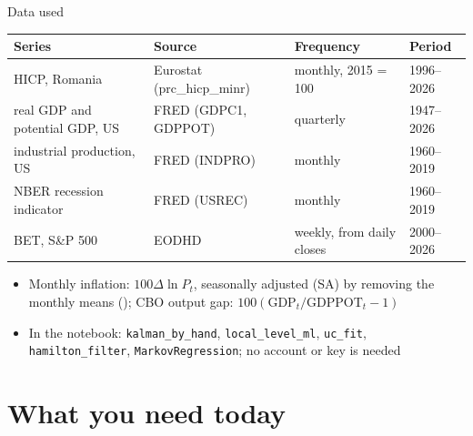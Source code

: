 \begin{frame}{Data used}
\itemsize{\small}
\begin{center}
\footnotesize
\begin{tabular}{llll}
\toprule
\textbf{Series} & \textbf{Source} & \textbf{Frequency} & \textbf{Period} \\
\midrule
HICP, Romania & Eurostat (prc\_hicp\_minr) & monthly, 2015 = 100 & 1996--2026 \\
real GDP and potential GDP, US & FRED (GDPC1, GDPPOT) & quarterly & 1947--2026 \\
industrial production, US & FRED (INDPRO) & monthly & 1960--2019 \\
NBER recession indicator & FRED (USREC) & monthly & 1960--2019 \\
BET, S\&P 500 & EODHD & weekly, from daily closes & 2000--2026 \\
\bottomrule
\end{tabular}
\end{center}
\begin{itemize}
    \item Monthly inflation: $100\Delta\ln P_t$, seasonally adjusted (SA) by removing the monthly means (); CBO output gap: $100(\mathrm{GDP}_t/\mathrm{GDPPOT}_t - 1)$
    \item In the notebook: \texttt{kalman\_by\_hand}, \texttt{local\_level\_ml}, \texttt{uc\_fit}, \texttt{hamilton\_filter}, \texttt{MarkovRegression}; no account or key is needed
\end{itemize}
\end{frame}


\section{What you need today}

